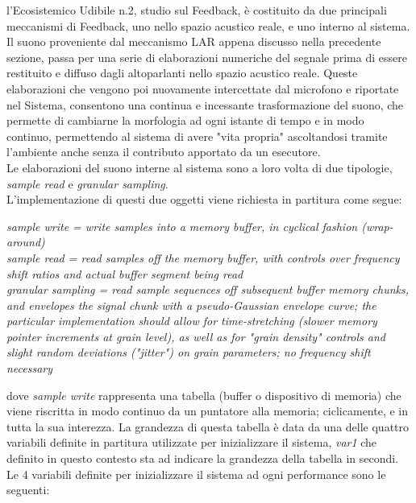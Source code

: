 l’Ecosistemico Udibile n.2, studio sul Feedback, è costituito
da due principali meccanismi di Feedback, uno nello spazio acustico reale,
e uno interno al sistema. \\
Il suono proveniente dal meccanismo LAR appena discusso nella precedente sezione,
passa per una serie di elaborazioni numeriche del segnale prima di essere restituito
e diffuso dagli altoparlanti nello spazio acustico reale. Queste elaborazioni
che vengono poi nuovamente intercettate dal microfono e riportate nel Sistema,
consentono una continua e incessante trasformazione del suono, che permette
di cambiarne la morfologia ad ogni istante di tempo e in modo continuo, 
permettendo al sistema di avere "vita propria" ascoltandosi tramite l'ambiente
anche senza il contributo apportato da un esecutore. \\
Le elaborazioni del suono interne al sistema sono a loro volta di due tipologie,
\textit{sample read} e \textit{granular sampling}. \\
L'implementazione di questi due oggetti viene richiesta in partitura come segue:

\begin{center}
    \vspace{0.5cm}
    \textit{sample write = write samples into a memory buffer, in cyclical fashion (wrap-around)} \\
    \textit{sample read = read samples off the memory buffer, with controls over frequency shift ratios and actual buffer segment being read} \\
    \textit{granular sampling = read sample sequences off subsequent buffer memory chunks, and envelopes the signal chunk with a pseudo-Gaussian envelope curve; the particular
    implementation should allow for time-stretching (slower memory pointer increments at grain level), as well as for "grain density" controls and slight random deviations ("jitter") on
    grain parameters; no frequency shift necessary} \\
    \vspace{0.5cm}
\end{center}

dove \textit{sample write} rappresenta una tabella (buffer o dispositivo di memoria) 
che viene riscritta in modo continuo da un puntatore alla memoria;
ciclicamente, e in tutta la sua interezza.
La grandezza di questa tabella è data da una delle quattro variabili definite 
in partitura utilizzate per inizializzare il sistema, \textit{var1} che definito in questo contesto sta ad indicare
la grandezza della tabella in secondi.
Le 4 variabili definite per inizializzare il sistema ad ogni performance sono le seguenti:

